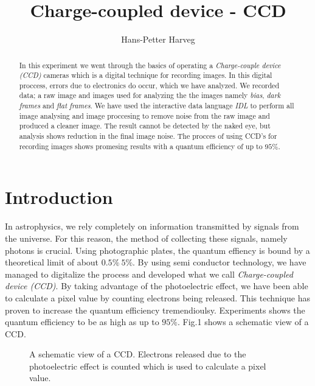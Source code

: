 \documentclass{emulateapj}
\begin{document}
\title{Charge-coupled device - CCD}

\author{Hans-Petter Harveg}





\begin{abstract}
In this experiment we went through the basics of operating a \textit{Charge-couple device (CCD)} cameras which is a digital technique for recording images. In this digital proccess, errors due to electronics do occur, which we have analyzed. We recorded data; a raw image and images used for analyzing the the images namely \textit{bias}, \textit{dark frames} and \textit{flat frames}. We have used the interactive data language \textit{IDL} to perform all image analysing and image proccesing to remove noise from the raw image and produced a cleaner image. The result cannot be detected by the naked eye, but analysis shows reduction in the final image noise. The procces of using CCD's for recording images shows promesing results with a quantum efficiency of up to $95\%$.
\end{abstract}


\section{Introduction}
\label{sec:introduction}
  In astrophysics, we rely completely on information transmitted by signals from the universe. For this reason, the method of collecting these signals, namely photons is crucial. Using photographic plates, the quantum effiency is bound by a theoretical limit of about $0.5\% ~ 5\%$. By using semi conductor technology, we have managed to digitalize the process and developed what we call \textit{Charge-coupled device (CCD)}. By taking advantage of the photoelectric effect, we have been able to calculate a pixel value by counting electrons being released. This technique has proven to increase the quantum efficiency tremendioulsy. Experiments shows the quantum efficiency to be as high as up to $95\%$. Fig.1 shows a schematic view of a CCD. 

\begin{figure}[H]
\mbox{}
\caption{A schematic view of a CCD. Electrons released due to the photoelectric effect is counted which is used to calculate a pixel value.}
\label{fig:figure_ccd_setup}
\end{figure}
\end{document}
